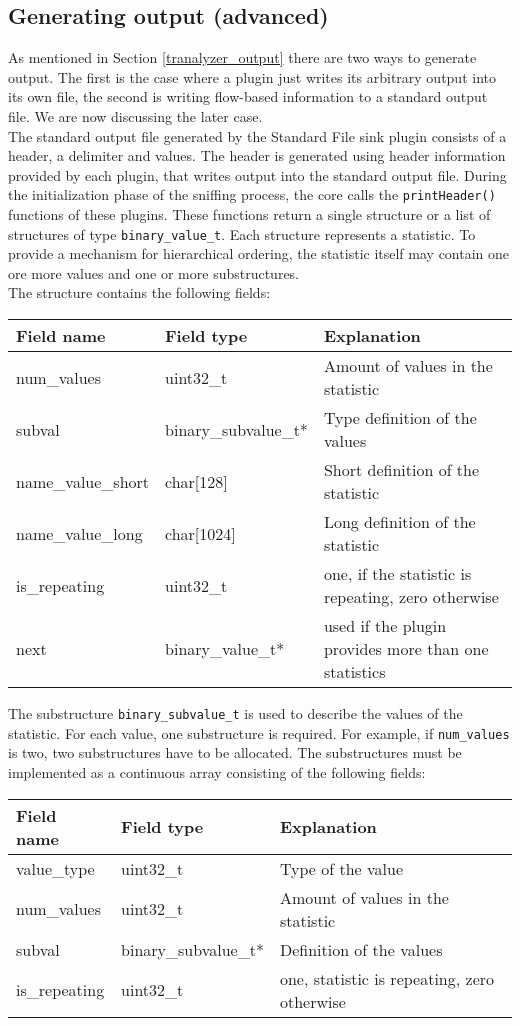 \documentclass[documentation]{subfiles}
\begin{document}
\subsection{Generating output (advanced)}\label{section:output2}
As mentioned in Section \ref{tranalyzer_output} there are two ways to generate output. The first is the case where a plugin just writes its arbitrary output into its own file, the second is writing flow-based information to a standard output file. We are now discussing the later case. \\
The standard output file generated by the Standard File sink plugin consists of a header, a delimiter and values. The header is generated using header information provided by each plugin, that writes output into the standard output file. During the initialization phase of the sniffing process, the core calls the {\tt printHeader()} functions of these plugins. These functions return a single structure or a list of structures of type {\tt binary\_value\_t}. Each structure represents a statistic. To provide a mechanism for hierarchical ordering, the statistic itself may contain one ore more values and one or more substructures.\\
The structure contains the following fields:
\begin{longtable}{lll}
    \toprule
    {\bf Field name} & {\bf Field type} & {\bf Explanation} \\
    \midrule\endhead%
    num\_values & uint32\_t & Amount of values in the statistic\\
    subval & binary\_subvalue\_t* & Type definition of the values\\
    name\_value\_short & char[128] & Short definition of the statistic\\
    name\_value\_long & char[1024] & Long definition of the statistic\\
    is\_repeating & uint32\_t & one, if the statistic is repeating, zero otherwise\\
    next & binary\_value\_t* & used if the plugin provides more than one statistics\\
    \bottomrule
\end{longtable}
The substructure {\tt binary\_subvalue\_t} is used to describe the values of the statistic. For each value, one substructure is required. For example, if {\tt num\_values} is two, two substructures have to be allocated. The substructures must be implemented as a continuous array consisting of the following fields:
\begin{longtable}{lll}
    \toprule
    {\bf Field name} & {\bf Field type} & {\bf Explanation} \\
    \midrule\endhead%
    value\_type & uint32\_t & Type of the value\\
    num\_values & uint32\_t & Amount of values in the statistic\\
    subval & binary\_subvalue\_t* & Definition of the values\\
    is\_repeating & uint32\_t & one, statistic is repeating, zero otherwise\\
    \bottomrule
\end{longtable}
\end{document}
